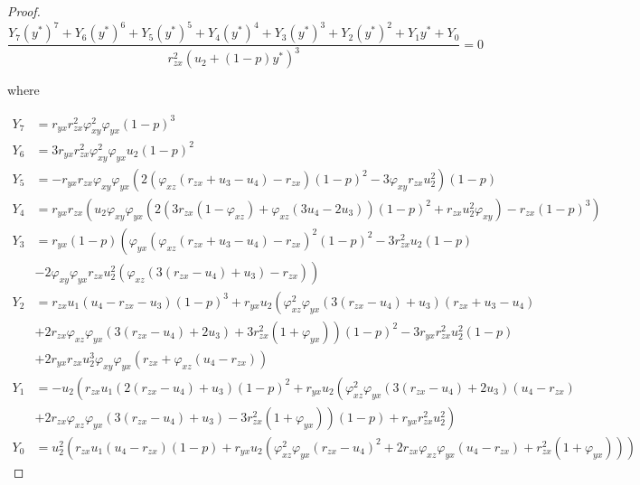 \begin{proof}
    \begin{equation}\label{eq:interior-Y}
        \frac{Y_7\left(y^*\right)^7+Y_6\left(y^*\right)^6+Y_5\left(y^*\right)^5+Y_4\left(y^*\right)^4+Y_3\left(y^*\right)^3+Y_2\left(y^*\right)^2+Y_1y^*+Y_0}{r_{zx}^2\left(u_2+\left(1-p\right)y^*\right)^3}=0
    \end{equation}

    where

    \begin{align*}
        Y_7 &= r_{yx}r_{zx}^2\varphi_{xy}^2\varphi_{yx}\left(1-p\right)^3\\
        Y_6 &= 3r_{yx}r_{zx}^2\varphi_{xy}^2\varphi_{yx}u_2\left(1-p\right)^2\\
        Y_5 &= -r_{yx}r_{zx}\varphi_{xy}\varphi_{yx}\left(2\left(\varphi_{xz}\left(r_{zx}+u_3-u_4\right)-r_{zx}\right)\left(1-p\right)^2-3\varphi_{xy}r_{zx}u_2^2\right)\left(1-p\right)\\
        Y_4 &= r_{yx}r_{zx}\left(u_2\varphi_{xy}\varphi_{yx}\left(2\left(3r_{zx}\left(1-\varphi_{xz}\right)+\varphi_{xz}\left(3u_4-2u_3\right)\right)\left(1-p\right)^2+r_{zx}u_2^2\varphi_{xy}\right)-r_{zx}\left(1-p\right)^3\right)\\
        Y_3 &= r_{yx}\left(1-p\right)\left(\varphi_{yx}\left(\varphi_{xz}\left(r_{zx}+u_3-u_4\right)-r_{zx}\right)^2\left(1-p\right)^2-3r_{zx}^2u_2\left(1-p\right)\right.\\
            &\left.-2\varphi_{xy}\varphi_{yx}r_{zx}u_2^2\left(\varphi_{xz}\left(3\left(r_{zx}-u_4\right)+u_3\right)-r_{zx}\right)\right)\\
        Y_2 &= r_{zx}u_1\left(u_4-r_{zx}-u_3\right)\left(1-p\right)^3+r_{yx}u_2\left(\varphi_{xz}^2\varphi_{yx}\left(3\left(r_{zx}-u_4\right)+u_3\right)\left(r_{zx}+u_3-u_4\right)\right.\\
            &\left.+2r_{zx}\varphi_{xz}\varphi_{yx}\left(3\left(r_{zx}-u_4\right)+2u_3\right)+3r_{zx}^2\left(1+\varphi_{yx}\right)\right)\left(1-p\right)^2-3r_{yx}r_{zx}^2u_2^2\left(1-p\right)\\
            &+2r_{yx}r_{zx}u_2^3\varphi_{xy}\varphi_{yx}\left(r_{zx}+\varphi_{xz}\left(u_4-r_{zx}\right)\right)\\
        Y_1 &= -u_2\left(r_{zx}u_1\left(2\left(r_{zx}-u_4\right)+u_3\right)\left(1-p\right)^2+r_{yx}u_2\left(\varphi_{xz}^2\varphi_{yx}\left(3\left(r_{zx}-u_4\right)+2u_3\right)\left(u_4-r_{zx}\right)\right.\right.\\
            &\left.\left.+2r_{zx}\varphi_{xz}\varphi_{yx}\left(3\left(r_{zx}-u_4\right)+u_3\right)-3r_{zx}^2\left(1+\varphi_{yx}\right)\right)\left(1-p\right)+r_{yx}r_{zx}^2u_2^2\right)\\
        Y_0 &= u_2^2\left(r_{zx}u_1\left(u_4-r_{zx}\right)\left(1-p\right)+r_{yx}u_2\left(\varphi_{xz}^2\varphi_{yx}\left(r_{zx}-u_4\right)^2+2r_{zx}\varphi_{xz}\varphi_{yx}\left(u_4-r_{zx}\right)+r_{zx}^2\left(1+\varphi_{yx}\right)\right)\right)
    \end{align*}


\end{proof}
